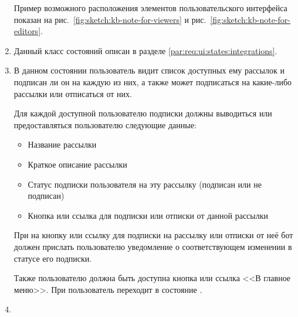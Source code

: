 \begin{enumerate}
                Пример возможного расположения элементов пользовательского интерфейса показан на
                рис.~\ref{fig:sketch:kb-note-for-viewers} и
                рис.~\ref{fig:sketch:kb-note-for-editors}.

            \item \label{itm:req:ui:states:integrationx}

                Данный класс состояний описан в разделе \ref{par:req:ui:states:integrations}.

            \item \label{itm:req:ui:states:subscriptions}

                В данном состоянии пользователь видит список доступных ему рассылок и подписан ли
                он на каждую из них, а также может подписаться на какие-либо рассылки или отписаться
                от них.

                Для каждой доступной пользователю подписки должны выводиться или предоставляться пользователю
                следующие данные:
                \begin{itemize}
                    \item
                        Название рассылки
                    \item
                        Краткое описание рассылки
                    \item
                        Статус подписки пользователя на эту рассылку (подписан или не подписан)
                    \item
                        Кнопка или ссылка для подписки или отписки от данной рассылки
                \end{itemize}

                При  на кнопку или ссылку для подписки на рассылку или отписки от неё
                бот должен прислать пользователю уведомление о соответствующем изменении в статусе
                его подписки.

                Также пользователю должна быть доступна кнопка или ссылка <<В главное меню>>.
                При  пользователь переходит в состояние
                \hyperref[itm:req:ui:states:mainmenu]
                {}.

            \item \label{itm:req:ui:states:adminpanel}


\end{enumerate}
